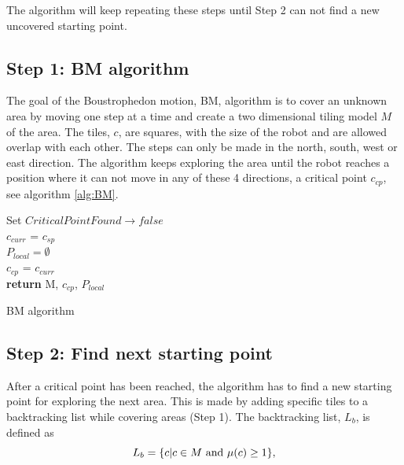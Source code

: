 The algorithm will keep repeating these steps until Step 2 can not find a new uncovered starting point.

\subsection{Step 1: BM algorithm}
The goal of the Boustrophedon motion, BM, algorithm is to cover an unknown area by moving one step at a time and create a two dimensional tiling model $M$ of the area. The tiles, $c$, are squares, with the size of the robot and are allowed overlap with each other. The steps can only be made in the north, south, west or east direction. The algorithm keeps exploring the area until the robot reaches a position where it can not move in any of these 4 directions, a critical point $c_{cp}$, see algorithm \ref{alg:BM}.

\begin{algorithm}[H]
\SetAlgoLined
{}
\textup{Set $CriticalPointFound \rightarrow false$} \\
$c_{curr}$ = $c_{sp}$ \\
$P_{local} = \emptyset$ \\ 
$c_{cp}$ = $c_{curr}$ \\
\textup{\textbf{return}} M, $c_{cp}$, $P_{local}$

 \caption{BM algorithm}
 \label{alg:BM}
\end{algorithm}

\subsection{Step 2: Find next starting point}
After a critical point has been reached, the algorithm has to find a new starting point for exploring the next area. This is made by adding specific tiles to a backtracking list while covering areas (Step 1). The backtracking list, $L_b$, is defined as
\begin{equation}
    L_b = \{ c | c \in M  \textup{ and } \mu(c) \ge 1  \},
\end{equation}

